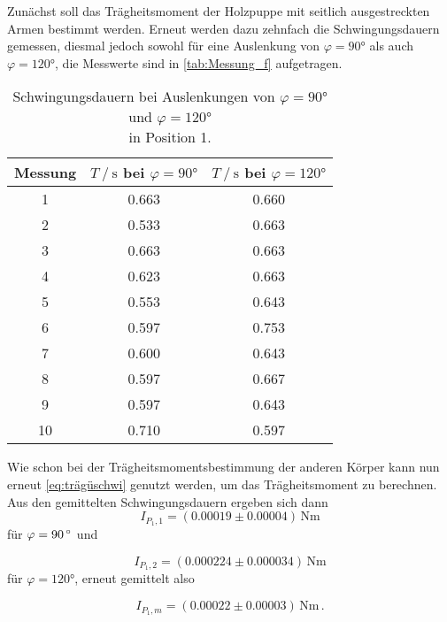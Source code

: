 Zunächst soll das Trägheitsmoment der Holzpuppe mit seitlich ausgestreckten Armen bestimmt werden.
Erneut werden dazu zehnfach die Schwingungsdauern gemessen, diesmal jedoch sowohl für eine Auslenkung von $\varphi = 90 \unit{\degree}$ als auch $\varphi = 120 \unit{\degree}$,
die Messwerte sind in \autoref{tab:Messung_f} aufgetragen.

\begin{table}[H]
  \centering
  \begin{tabular}{S[table-format=2.0] S[table-format=1.3] S}
      \toprule
      {Messung} & {$T \mathbin{/} \unit{\second}$ bei $\varphi = 90 \unit{\degree}$} & {$T \mathbin{/} \unit{\second}$ bei $\varphi = 120 \unit{\degree}$}\\
       & 0.663 & 0.660 \\
      2 & 0.533 & 0.663 \\
      3 & 0.663 & 0.663 \\
      4 & 0.623 & 0.663 \\
      5 & 0.553 & 0.643 \\
      6 & 0.597 & 0.753 \\
      7 & 0.600 & 0.643 \\
      8 & 0.597 & 0.667 \\
      9 & 0.597 & 0.643 \\
      10& 0.710 & 0.597 \\
      \bottomrule
  \end{tabular}
  \caption{Schwingungsdauern bei Auslenkungen von $\varphi = 90 \unit{\degree}$ und $\varphi = 120 \unit{\degree}$ \\ in Position 1.}
  \label{tab:Messung_f}
\end{table}

Wie schon bei der Trägheitsmomentsbestimmung der anderen Körper kann nun erneut \eqref{eq:trägüschwi} genutzt werden, um das Trägheitsmoment zu berechnen.
Aus den gemittelten Schwingungsdauern ergeben sich dann
\begin{equation*}
  I_{P_1,1} = (0.00019 \pm 0.00004) \, \unit{\newton\meter} 
\end{equation*} 
für $\varphi = 90 \, \unit{{\degree}}$ und

\begin{equation*}
  I_{P_1,2} = (0.000224 \pm 0.000034) \, \unit{\newton\meter} 
\end{equation*}
für $\varphi = 120 \unit{\degree}$, erneut gemittelt also

\begin{equation*}
  I_{P_1,m} = (0.00022 \pm 0.00003) \, \unit{\newton\meter} \,.
\end{equation*}

